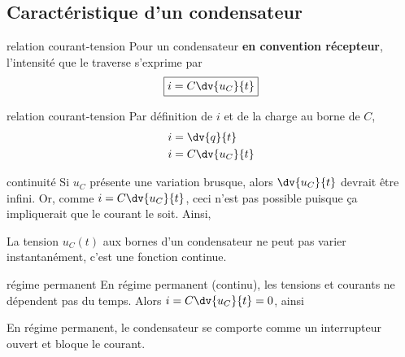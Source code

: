 \documentclass[../main/main.tex]{subfiles}
\begin{document}
\subsection{Caractéristique d'un condensateur}
\begin{tcbraster}[raster columns=2, raster equal height=rows]
    \begin{prop}[label=prop:Ccarac]{relation courant-tension}
        Pour un condensateur \textbf{en convention récepteur}, l'intensité que
        le traverse s'exprime par
        \[\boxed{i = C \dv{u_C}{t}}\]
    \end{prop}
    \begin{demo}[label=demo:Ccarac]{relation courant-tension}
        Par définition de $i$ et de la charge au borne de $C$,
        \begin{align*}
            i &= \dv{q}{t}\\
            i &= C \dv{u_C}{t}
        \end{align*}
    \end{demo}
    \begin{impl}[label=impl:continuité]{continuité}
        Si $u_C$ présente une variation brusque, alors $ \dv{u_C}{t}$ devrait
        être infini. Or, comme $i = C \dv{u_C}{t}$, ceci n'est pas possible
        puisque ça impliquerait que le courant le soit. Ainsi,
        \begin{framed}
            La tension $u_C(t)$ aux bornes d'un condensateur ne peut pas
            varier instantanément, c'est une fonction continue.
        \end{framed}
    \end{impl}
    \begin{impl}[label=impl:permanent]{régime permanent}
        En régime permanent (continu), les tensions et courants ne dépendent pas
        du temps. Alors $i = C \dv{u_C}{t} = 0$, ainsi
        \begin{framed}
            En régime permanent, le condensateur se comporte comme un
            interrupteur ouvert et bloque le courant.
        \end{framed}
    \end{impl}
\end{tcbraster}
\end{document}
